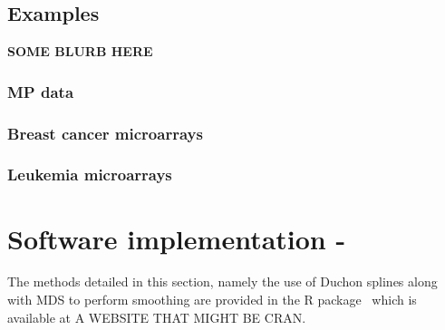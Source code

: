 

%
\subsection{Examples}

\textbf{SOME BLURB HERE}


\subsubsection{MP data}




\subsubsection{Breast cancer microarrays}




\subsubsection{Leukemia microarrays}



\section{Software implementation - \mdspack}

The methods detailed in this section, namely the use of Duchon splines along with MDS to perform smoothing are provided in the \textsf{R} package \mdspack\ which is available at A WEBSITE THAT MIGHT BE CRAN.



